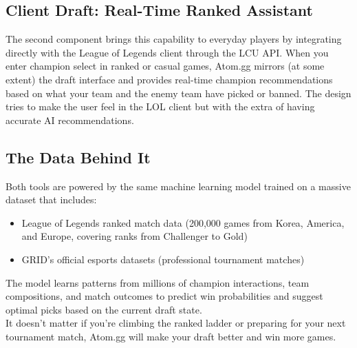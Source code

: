 \documentclass[12pt, a4paper]{article}
\begin{document}
    \subsection*{Client Draft: Real-Time Ranked Assistant}

    The second component brings this capability to everyday players by integrating directly with the League of Legends client through the LCU API. When you enter champion select in ranked or casual games, Atom.gg mirrors (at some extent) the draft interface and provides real-time champion recommendations based on what your team and the enemy team have picked or banned. The design tries to make the user feel in the  LOL client but with the extra of having accurate AI recommendations.

    \subsection*{The Data Behind It}

    Both tools are powered by the same machine learning model trained on a massive dataset that includes:

    \begin{itemize}
        \item League of Legends ranked match data (200,000 games from Korea, America, and Europe, covering ranks from Challenger to Gold)
        \item GRID's official esports datasets (professional tournament matches)
    \end{itemize}

    The model learns patterns from millions of champion interactions, team compositions, and match outcomes to predict win probabilities and suggest optimal picks based on the current draft state.
    \\
    It doesn't matter if you're climbing the ranked ladder or preparing for your next tournament match, Atom.gg will make your draft better and win more games.

    \newpage
\end{document}

